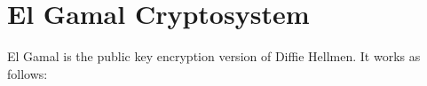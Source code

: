 \documentclass{scribe}
\begin{document}
\vspace{10mm}


\section{El Gamal Cryptosystem}
El Gamal is the public key encryption version of Diffie Hellmen. It works as follows:


\vspace{10mm}




%

\end{document}
